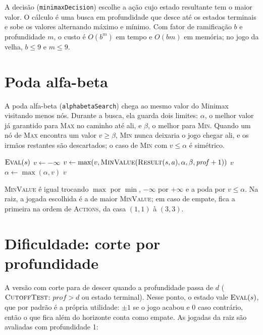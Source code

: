 \documentclass[11pt,a4paper]{article}
\begin{document}
A decisão (\texttt{minimaxDecision}) escolhe a ação cujo estado resultante tem
o maior valor. O cálculo é uma busca em profundidade que desce até os estados
terminais e sobe os valores alternando máximo e mínimo. Com fator de
ramificação $b$ e profundidade $m$, o custo é $O(b^m)$ em tempo e $O(bm)$ em
memória; no jogo da velha, $b \le 9$ e $m \le 9$.

\section{Poda alfa-beta}

A poda alfa-beta (\texttt{alphabetaSearch}) chega ao mesmo valor do Minimax
visitando menos nós. Durante a busca, ela guarda dois limites:
$\alpha$, o melhor valor já garantido para \textsc{Max} no caminho até ali, e
$\beta$, o melhor para \textsc{Min}. Quando um nó de \textsc{Max} encontra
um valor $v \ge \beta$, \textsc{Min} nunca deixaria o jogo chegar ali, e os
irmãos restantes são descartados; o caso de \textsc{Min} com $v \le \alpha$ é
simétrico.

\begin{algorithm}[h]
\caption{Alfa-beta com corte (\texttt{alphabetaCutoffSearch}), lado de \textsc{Max}}
\begin{algorithmic}[1]
   \Return $\textsc{Eval}(s)$ \EndIf
  \State $v \gets -\infty$
    \State $v \gets \max(v, \textsc{MinValue}(\textsc{Result}(s, a), \alpha, \beta, \mathit{prof}+1))$
     \Return $v$ \EndIf
    \State $\alpha \gets \max(\alpha, v)$
  \EndFor
  \State \Return $v$
\EndFunction
\end{algorithmic}
\end{algorithm}

\textsc{MinValue} é igual trocando $\max$ por $\min$, $-\infty$ por $+\infty$
e a poda por $v \le \alpha$. Na raiz, a jogada escolhida é a de maior
\textsc{MinValue}; em caso de empate, fica a primeira na ordem de
\textsc{Actions}, da casa $(1,1)$ à $(3,3)$.

\section{Dificuldade: corte por profundidade}\label{sec:corte}

A versão com corte para de descer quando a profundidade passa de $d$
($\textsc{CutoffTest}$: $\mathit{prof} > d$ ou estado terminal). Nesse ponto,
o estado vale $\textsc{Eval}(s)$, que por padrão é a própria utilidade: $\pm1$
se o jogo acabou e $0$ caso contrário, então o que fica além do horizonte conta
como empate. As jogadas da raiz são avaliadas com profundidade 1:
\end{document}

